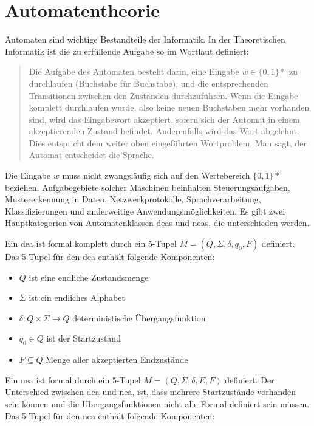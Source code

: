 \section{Automatentheorie}\label{automatatheory}
Automaten sind wichtige Bestandteile der Informatik. In der Theoretischen Informatik ist die zu erfüllende Aufgabe so im Wortlaut definiert:

\begin{quote}
\glqq Die Aufgabe des Automaten besteht darin, eine Eingabe $w \in \{0, 1 \}\ast$ zu
durchlaufen (Buchstabe für Buchstabe), und die entsprechenden Transitionen
zwischen den Zuständen durchzuführen. Wenn die Eingabe komplett
durchlaufen wurde, also keine neuen Buchstaben mehr vorhanden sind, wird
das Eingabewort akzeptiert, sofern sich der Automat in einem akzeptierenden
Zustand befindet. Anderenfalls wird das Wort abgelehnt. Dies entspricht dem
weiter oben eingeführten Wortproblem. Man sagt, der Automat entscheidet
die Sprache.\grqq \cite{theororeticalinformatic}
\end{quote}

Die Eingabe $w$ muss nicht zwangsläufig sich auf den Wertebereich $\{0, 1 \}\ast$ beziehen. Aufgabegebiete solcher Maschinen beinhalten Steuerungsaufgaben, Mustererkennung in Daten, Netzwerkprotokolle, Sprachverarbeitung, Klassifizierungen und anderweitige Anwendungsmöglichkeiten. Es gibt zwei Hauptkategorien von Automatenklassen \acp{dea} und \acp{nea}, die unterschieden werden.

Ein \ac{dea} ist formal komplett durch ein 5-Tupel $M = (Q, \Sigma, \delta, q_0, F)$ definiert. Das 5-Tupel für den \ac{dea} enthält folgende Komponenten:

\begin{itemize}
  \setlength\itemsep{-0.6em}
\item $Q$  ist eine endliche Zustandsmenge
\item $\Sigma$ ist ein endliches Alphabet
\item $\delta:Q \times \Sigma \rightarrow Q$ deterministische Übergangsfunktion
\item $q_0 \in Q$ ist der Startzustand
\item $F \subseteq Q$ Menge aller akzeptierten Endzustände
\end{itemize}


Ein \ac{nea} ist formal durch ein 5-Tupel $M = (Q, \Sigma, \delta, E, F)$ definiert. Der Unterschied zwischen \ac{dea} und \ac{nea}, ist, dass mehrere Startzustände vorhanden sein können und die Übergangsfunktionen nicht alle Formal definiert sein müssen. Das 5-Tupel für den \ac{nea} enthält folgende Komponenten:

